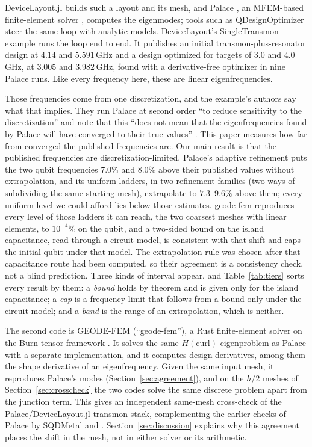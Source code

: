 \documentclass{anvil-paper}
\begin{document}
DeviceLayout.jl \citep{devicelayout} builds such a layout and its mesh, and
Palace \citep{palace}, an MFEM-based finite-element solver \citep{mfem},
computes the eigenmodes; tools such as QDesignOptimizer
\citep{eriksson2025automated} steer the same loop with analytic models.
DeviceLayout's SingleTransmon example
\citep{devicelayout-blog,devicelayout-example} runs the loop end to end. It
publishes an initial transmon-plus-resonator design at $4.14$ and
$5.591$\,GHz and a design optimized for targets of $3.0$ and $4.0$\,GHz, at
$3.005$ and $3.982$\,GHz, found with a derivative-free optimizer in nine
Palace runs. Like every frequency here, these are linear
eigenfrequencies.

Those frequencies come from one discretization, and the example's authors
say what that implies. They run Palace at second order ``to reduce
sensitivity to the discretization'' and note that this ``does not mean that
the eigenfrequencies found by Palace will have converged to their true
values'' \citep{devicelayout-example}. This paper measures
how far from converged the published frequencies are. Our
main result is that the published frequencies are discretization-limited.
Palace's adaptive refinement puts the two qubit frequencies $7.0\%$ and
$8.0\%$ above their published values without extrapolation, and its
uniform ladders, in two refinement families (two ways of subdividing the
same starting mesh), extrapolate to $7.3$--$9.6\%$ above them;
every uniform level we could afford lies below those estimates. geode-fem
reproduces every level of those ladders it can reach, the two coarsest
meshes with linear elements, to $10^{-4}\%$ on the qubit, and a
two-sided bound on the island capacitance, read through a circuit model, is
consistent with that shift and caps the initial qubit under that model.
The extrapolation rule was chosen after that capacitance route had been
computed, so their agreement is a consistency check, not a blind prediction.
Three kinds of interval appear, and Table~\ref{tab:tiers} sorts every
result by them: a \emph{bound} holds by theorem and is given only for the
island capacitance; a \emph{cap} is a frequency limit that follows from
a bound only under the circuit model; and a \emph{band} is the range of
an extrapolation, which is neither.

The second code is GEODE-FEM (``geode-fem''), a Rust finite-element solver
on the Burn tensor framework \citep{burn}. It solves the same
$H(\mathrm{curl})$ eigenproblem as Palace with a separate implementation,
and it computes design derivatives, among them the shape derivative of an
eigenfrequency. Given the same input mesh, it reproduces Palace's modes
(Section~\ref{sec:agreement}), and on the $h/2$ meshes of
Section~\ref{sec:crosscheck} the two codes solve the same discrete problem
apart from the junction term. This gives an independent
same-mesh cross-check of the Palace/DeviceLayout.jl transmon stack,
complementing the earlier checks of Palace by SQDMetal
\citep{sommers2025open} and \citet{ye2025electromagnetic}.
Section~\ref{sec:discussion} explains why this agreement places the shift
in the mesh, not in either solver or its arithmetic.
\end{document}
